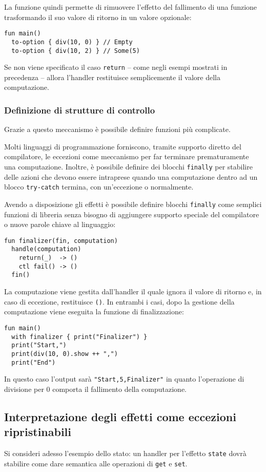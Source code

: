 La funzione quindi permette di rimuovere l'effetto del fallimento di una funzione trasformando il suo valore di ritorno in un valore opzionale:
\begin{lstlisting}[language=koka]
fun main()
  to-option { div(10, 0) } // Empty
  to-option { div(10, 2) } // Some(5)
\end{lstlisting}

Se non viene specificato il caso \lstinline{return} -- come negli esempi mostrati in precedenza -- allora l'handler restituisce semplicemente il valore della computazione.

\subsubsection{Definizione di strutture di controllo}
Grazie a questo meccanismo è possibile definire funzioni più complicate.

Molti linguaggi di programmazione forniscono, tramite supporto diretto del compilatore, le eccezioni come meccanismo per far terminare prematuramente una computazione.
Inoltre, è possibile definire dei blocchi \lstinline{finally} per stabilire delle azioni che devono essere intraprese quando una computazione dentro ad un blocco \lstinline{try-catch} termina, con un'eccezione o normalmente.

Avendo a disposizione gli effetti è possibile definire blocchi \lstinline{finally} come semplici funzioni di libreria senza bisogno di aggiungere supporto speciale del compilatore o nuove parole chiave al linguaggio:
\begin{lstlisting}[language=koka]
fun finalizer(fin, computation)
  handle(computation)
    return(_)  -> ()
    ctl fail() -> ()
  fin()
\end{lstlisting}
La computazione viene gestita dall'handler il quale ignora il valore di ritorno e, in caso di eccezione, restituisce \lstinline{()}. In entrambi i casi, dopo la gestione della computazione viene eseguita la funzione di finalizzazione:
\begin{lstlisting}[language=koka]
fun main()
  with finalizer { print("Finalizer") }
  print("Start,")
  print(div(10, 0).show ++ ",")
  print("End")
\end{lstlisting}
In questo caso l'output sarà \lstinline{"Start,5,Finalizer"} in quanto l'operazione di divisione per 0 comporta il fallimento della computazione.

\subsection{Interpretazione degli effetti come eccezioni ripristinabili}
Si consideri adesso l'esempio dello stato: un handler per l'effetto \lstinline{state} dovrà stabilire come dare semantica alle operazioni di \lstinline{get} e \lstinline{set}.

